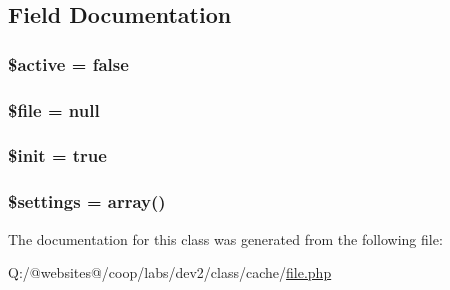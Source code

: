 \subsection{Field Documentation}
\hypertarget{class_cache_file_aacd1fa47b7ea59451aff98beca4360ae}{
\subsubsection[{\$active}]{\setlength{\rightskip}{0pt plus 5cm}\${\bf active} = false}}\label{class_cache_file_aacd1fa47b7ea59451aff98beca4360ae}
\hypertarget{class_cache_file_aa1bfbd27060176201b271918dff57e8f}{
\subsubsection[{\$file}]{\setlength{\rightskip}{0pt plus 5cm}\$file = null}}\label{class_cache_file_aa1bfbd27060176201b271918dff57e8f}
\hypertarget{class_cache_file_a8834b0851b05d161c207a7d2e5dca9bd}{
\subsubsection[{\$init}]{\setlength{\rightskip}{0pt plus 5cm}\${\bf init} = true}}\label{class_cache_file_a8834b0851b05d161c207a7d2e5dca9bd}
\hypertarget{class_cache_file_ac7c3353107070daa85f641882931b358}{
\subsubsection[{\$settings}]{\setlength{\rightskip}{0pt plus 5cm}\${\bf settings} = array()}}\label{class_cache_file_ac7c3353107070daa85f641882931b358}


The documentation for this class was generated from the following file\-:\begin{DoxyCompactItemize}
\item 
Q\-:/@websites@/coop/labs/dev2/class/cache/\hyperlink{file_8php}{file.\-php}\end{DoxyCompactItemize}
